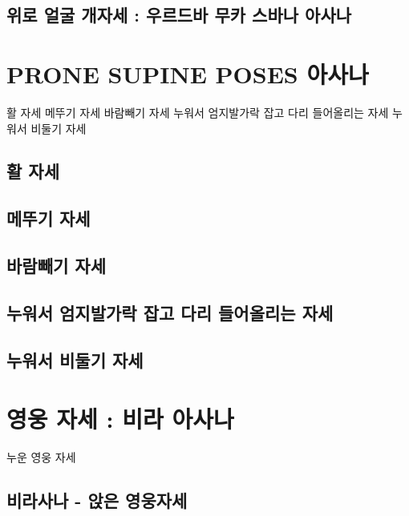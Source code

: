 \documentclass[12pt, a4paper, oneside]{book}
\let\stdsection\section
\renewcommand\section{\newpage\stdsection}
\begin{document}
		\section{ 위로 얼굴 개자세 : 우르드바 무카 스바나 아사나 }



	\chapter{PRONE SUPINE POSES 아사나}
	\newpage
	\minitoc


	활 자세
	메뚜기 자세
	바람빼기 자세
	누워서 엄지발가락 잡고 다리 들어올리는 자세
	누워서 비둘기 자세


		\section{ 	활 자세}
		\section{ 	메뚜기 자세}
		\section{ 	바람빼기 자세}
		\section{ 	누워서 엄지발가락 잡고 다리 들어올리는 자세}
		\section{ 	누워서 비둘기 자세}

	\chapter{영웅 자세 : 비라 아사나}
	\newpage
	\minitoc


	누운 영웅 자세


	\section{비라사나 - 앉은 영웅자세}
\end{document}
